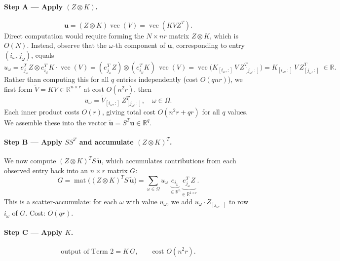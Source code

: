 \documentclass[12pt]{article}
\theoremstyle{definition}
\DeclareMathOperator{\vecop}{vec}
\DeclareMathOperator{\mat}{mat}
\newcommand{\R}{\mathbb{R}}
\begin{document}
\paragraph{Step A — Apply $(Z\otimes K)$.}
\begin{equation}\label{eq:stepA}
  \mathbf{u} = (Z\otimes K)\vecop(V) = \vecop(KVZ^T).
\end{equation}
Direct computation would require forming the $N\times nr$ matrix $Z\otimes K$,
which is $O(N)$.  Instead, observe that the $\omega$-th component of
$\mathbf{u}$, corresponding to entry $(i_\omega,j_\omega)$, equals
\begin{equation}\label{eq:u_omega}
  u_\omega
  = e_{j_\omega}^T Z\otimes e_{i_\omega}^T K \cdot \vecop(V)
  = (e_{j_\omega}^T Z)\otimes (e_{i_\omega}^T K)\,\vecop(V)
  = \vecop\!\bigl(K_{[i_\omega,:]}\,V\,Z_{[j_\omega,:]}^T\bigr)
  = K_{[i_\omega,:]}\,V\,Z_{[j_\omega,:]}^T \;\in\R.
\end{equation}
Rather than computing this for all $q$ entries independently (cost $O(qnr)$),
we first form $\widetilde{V} = KV\in\R^{n\times r}$ at cost $O(n^2r)$, then
\begin{equation}
  u_\omega = \widetilde{V}_{[i_\omega,:]}\,Z_{[j_\omega,:]}^T,
  \quad \omega\in\Omega.
\end{equation}
Each inner product costs $O(r)$, giving total cost $O(n^2r + qr)$ for all
$q$ values.  We assemble these into the vector
$\tilde{\mathbf{u}} = S^T\mathbf{u}\in\R^q$.

\paragraph{Step B — Apply $SS^T$ and accumulate $(Z\otimes K)^T$.}
We now compute $(Z\otimes K)^T S\,\tilde{\mathbf{u}}$, which accumulates
contributions from each observed entry back into an $n\times r$ matrix $G$:
\begin{equation}\label{eq:stepB}
  G = \mat\!\bigl((Z\otimes K)^T S\,\tilde{\mathbf{u}}\bigr)
  = \sum_{\omega\in\Omega} u_\omega\,
    \underbrace{e_{i_\omega}}_{\in\R^n}
    \underbrace{e_{j_\omega}^T Z}_{\in\R^{1\times r}}.
\end{equation}
This is a scatter-accumulate: for each $\omega$ with value $u_\omega$, we add
$u_\omega\cdot Z_{[j_\omega,:]}$ to row $i_\omega$ of $G$.  Cost: $O(qr)$.

\paragraph{Step C — Apply $K$.}
\begin{equation}\label{eq:stepC}
  \text{output of Term 2} = K\,G, \qquad \text{cost } O(n^2 r).
\end{equation}
\end{document}
